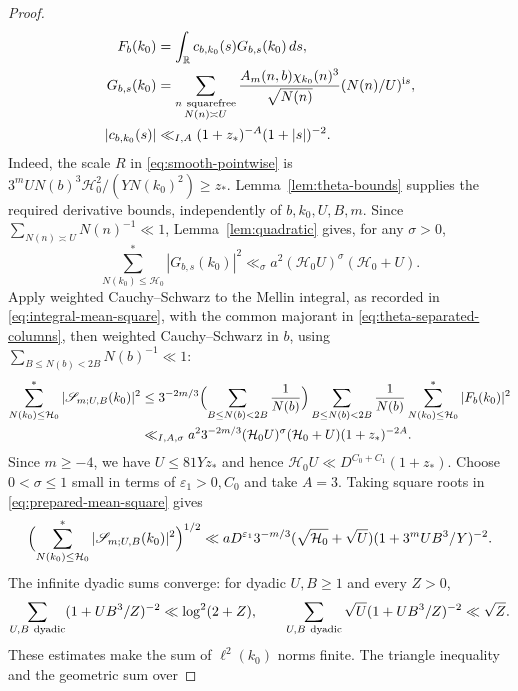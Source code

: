 \begin{proof}
\begin{equation}\label{eq:theta-separated-columns}
 \begin{aligned}
 F_b(k_0)&=\int_{\mathbb R}c_{b,k_0}(s)G_{b,s}(k_0)\,ds,\\
 G_{b,s}(k_0)&=\sum_{\substack{n\ {\rm squarefree}\\N(n)\asymp U}}
 \frac{A_m(n,b)\chi_{k_0}(n)^3}{\sqrt{N(n)}}
             (N(n)/U)^{\mathrm i s},\\
 |c_{b,k_0}(s)|&\ll_{I,A}(1+z_*)^{-A}(1+|s|)^{-2}.
 \end{aligned}
\end{equation}
Indeed, the scale $R$ in \eqref{eq:smooth-pointwise} is
$3^mUN(b)^3\mathcal H_0^2/(YN(k_0)^2)\ge z_*$.
Lemma~\ref{lem:theta-bounds} supplies the required derivative
bounds, independently of $b,k_0,U,B,m$.
Since $\sum_{N(n)\asymp U}N(n)^{-1}\ll1$,
Lemma~\ref{lem:quadratic} gives, for any $\sigma>0$,
\[
 \sum_{N(k_0)\le\mathcal H_0}^*|G_{b,s}(k_0)|^2
 \ll_{\sigma}a^2(\mathcal H_0U)^\sigma(\mathcal H_0+U).
\]
Apply weighted Cauchy--Schwarz to the Mellin integral, as recorded in
\eqref{eq:integral-mean-square}, with the common majorant in
\eqref{eq:theta-separated-columns}, then weighted Cauchy--Schwarz in $b$, using
$\sum_{B\le N(b)<2B}N(b)^{-1}\ll1$:
\begin{equation}\label{eq:prepared-mean-square}
 \begin{aligned}
 \sum_{N(k_0)\le\mathcal H_0}^*|\mathscr S_{m;U,B}(k_0)|^2
 &\le3^{-2m/3}\Bigl(\sum_{B\le N(b)<2B}\frac1{N(b)}\Bigr)
       \sum_{B\le N(b)<2B}\frac1{N(b)}
       \sum_{N(k_0)\le\mathcal H_0}^*|F_b(k_0)|^2\\
 &\ll_{I,A,\sigma}a^2 3^{-2m/3}
       (\mathcal H_0U)^\sigma(\mathcal H_0+U)(1+z_*)^{-2A}.
 \end{aligned}
\end{equation}
Since $m\ge-4$, we have $U\le81Yz_*$ and hence
$\mathcal H_0U\ll D^{C_0+C_1}(1+z_*)$.
Choose $0<\sigma\le1$ small in terms of $\varepsilon_1>0,C_0$ and take
$A=3$. Taking square roots in \eqref{eq:prepared-mean-square} gives
\[
 \Bigl(\sum_{N(k_0)\le\mathcal H_0}^*|\mathscr S_{m;U,B}(k_0)|^2\Bigr)^{1/2}
 \ll aD^{\varepsilon_1}3^{-m/3}
       (\sqrt{\mathcal H_0}+\sqrt U)(1+3^mUB^3/Y)^{-2}.
\]
The infinite dyadic sums converge: for dyadic $U,B\ge1$ and every $Z>0$,
\[
 \sum_{U,B\ {\rm dyadic}}(1+UB^3/Z)^{-2}\ll\log^2(2+Z),
 \qquad
 \sum_{U,B\ {\rm dyadic}}\sqrt U(1+UB^3/Z)^{-2}\ll\sqrt Z.
\]
These estimates make the sum of $\ell^2(k_0)$ norms finite.
The triangle inequality and the geometric sum over

\end{proof}
